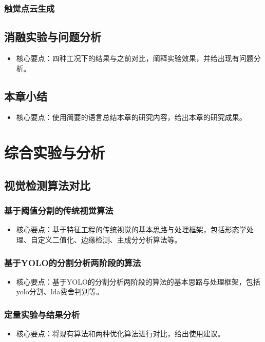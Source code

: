 \documentclass{Diploma}
\begin{document}
\begin{}
\subsection{触觉点云生成}
\section{消融实验与问题分析}
\begin{itemize}
  \item 核心要点：四种工况下的结果与之前对比，阐释实验效果，并给出现有问题分析。
\end{itemize}
\section{本章小结}
\begin{itemize}
  \item 核心要点：使用简要的语言总结本章的研究内容，给出本章的研究成果。
\end{itemize}
\chapter{综合实验与分析}
\section{视觉检测算法对比}
\subsection{基于阈值分割的传统视觉算法}
\begin{itemize}
  \item 核心要点：基于特征工程的传统视觉的基本思路与处理框架，包括形态学处理、自定义二值化、边缘检测、主成分分析算法等。
\end{itemize}
\subsection{基于YOLO的分割分析两阶段的算法}
\begin{itemize}
  \item 核心要点：基于YOLO的分割分析两阶段的算法的基本思路与处理框架，包括yolo分割、lda费舍判别等。
\end{itemize}
\subsection{定量实验与结果分析}
\begin{itemize}
  \item 核心要点：将现有算法和两种优化算法进行对比，给出使用建议。
\end{itemize}

\end{}
\end{document}
